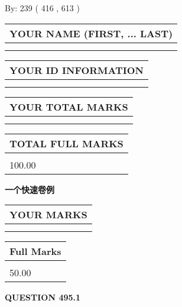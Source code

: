 \documentclass{ctexart}
\begin{document}
   
\hspace{1.0in} By: 
 239 ( 416 ,  613 )
   
   
   
   
\newpage 
\setcounter{page}{ 
   495001 } 
   
   
   
   
\noindent\begin{tabular}{|l|}
\hline
YOUR NAME (FIRST, ... LAST)  \\
\hline
 \\ 
 \\ 
\hline
\end{tabular}
\hspace{0.05in} \begin{tabular}{|l|}
\hline
 YOUR   ID   INFORMATION  \\
\hline
 \\ 
 \\ 
\hline
\end{tabular}
   
   
\vspace{0.2in}\noindent\begin{tabular}{|l|}
\hline
YOUR TOTAL MARKS  \\
\hline
 \\ 
 \\ 
\hline
\end{tabular}
\hspace{0.05in} \begin{tabular}{|l|}
\hline
TOTAL FULL MARKS  \\
\hline
 \\ 
100.00 \\
\hline
\end{tabular}
   
   
 \vspace{0.2in}
{\LARGE {\textbf{ 一个快速卷例}}}
   
   
  
\vspace{0.2in}
  
\noindent\begin{tabular}{|l|}
\hline
 YOUR MARKS  \\
\hline
 \\ 
 \\ 
\hline
\end{tabular}
\hspace{0.05in} \begin{tabular}{|l|}
\hline
 Full Marks  \\
\hline
 \\ 
50.00 \\
\hline
\end{tabular}
{\textbf{\Large{QUESTION
495.1 
}}}
  
\end{document}
